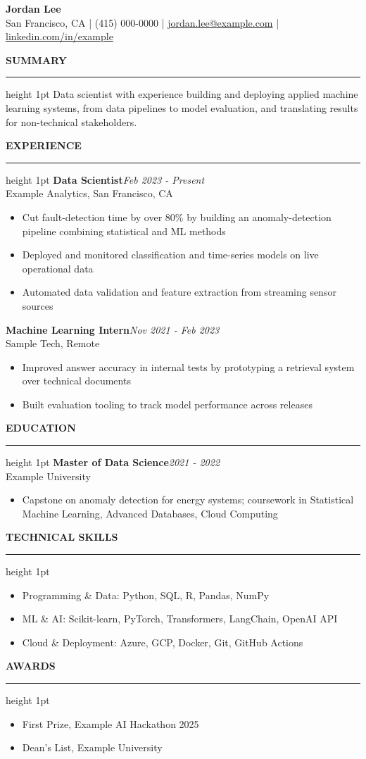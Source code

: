\documentclass[10pt]{article}
\newcommand{\sectionrule}{\vspace{2pt}\hrule height 1pt\vspace{5pt}}
\newcommand{\resumesection}[1]{{\large\textbf{\MakeUppercase{#1}}}\sectionrule}
\newcommand{\jobtitle}[3]{\textbf{#1}\hfill \textit{#2}\\#3\\[2pt]}
\begin{document}
\vspace*{0pt}

\begin{center}
{\fontsize{20pt}{24pt}\selectfont\textbf{Jordan Lee}}\\[6pt]
San Francisco, CA \;|\; (415) 000-0000 \;|\; \href{mailto:jordan.lee@example.com}{jordan.lee@example.com} \;|\; \href{https://www.linkedin.com/in/example}{linkedin.com/in/example}
\end{center}
\vspace{4pt}
\raggedright

\resumesection{Summary}
Data scientist with experience building and deploying applied machine learning systems, from data pipelines to model evaluation, and translating results for non-technical stakeholders.

\vspace{6pt}
\resumesection{Experience}
\jobtitle{Data Scientist}{Feb 2023 - Present}{Example Analytics, San Francisco, CA}
\begin{itemize}
  \item Cut fault-detection time by over 80\% by building an anomaly-detection pipeline combining statistical and ML methods
  \item Deployed and monitored classification and time-series models on live operational data
  \item Automated data validation and feature extraction from streaming sensor sources
\end{itemize}

\jobtitle{Machine Learning Intern}{Nov 2021 - Feb 2023}{Sample Tech, Remote}
\begin{itemize}
  \item Improved answer accuracy in internal tests by prototyping a retrieval system over technical documents
  \item Built evaluation tooling to track model performance across releases
\end{itemize}

\vspace{6pt}
\resumesection{Education}
\jobtitle{Master of Data Science}{2021 - 2022}{Example University}
\begin{itemize}
  \item Capstone on anomaly detection for energy systems; coursework in Statistical Machine Learning, Advanced Databases, Cloud Computing
\end{itemize}

\vspace{6pt}
\resumesection{Technical Skills}
\begin{itemize}
  \item Programming \& Data: Python, SQL, R, Pandas, NumPy
  \item ML \& AI: Scikit-learn, PyTorch, Transformers, LangChain, OpenAI API
  \item Cloud \& Deployment: Azure, GCP, Docker, Git, GitHub Actions
\end{itemize}

\vspace{6pt}
\resumesection{Awards}
\begin{itemize}
  \item First Prize, Example AI Hackathon 2025
  \item Dean's List, Example University
\end{itemize}
\end{document}

